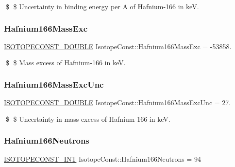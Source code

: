 \$ \$ Uncertainty in binding energy per A of Hafnium-\/166 in keV. \mbox{\label{group___isotope_const-_hafnium-_hf166_ga50a76d0c3fadf6638e1f6986a3275dd7}} 
\subsubsection{\texorpdfstring{Hafnium166\+Mass\+Exc}{Hafnium166MassExc}}
{\footnotesize\ttfamily \mbox{\hyperlink{group___isotope_const-_macros_ga8f45a7272ce02c0b4c65c44636ed719a}{I\+S\+O\+T\+O\+P\+E\+C\+O\+N\+S\+T\+\_\+\+D\+O\+U\+B\+LE}} Isotope\+Const\+::\+Hafnium166\+Mass\+Exc = -\/53858.}

\$ \$ Mass excess of Hafnium-\/166 in keV. \mbox{\label{group___isotope_const-_hafnium-_hf166_gae06bde1c7e7ce992949e9478ebd5bb50}} 
\subsubsection{\texorpdfstring{Hafnium166\+Mass\+Exc\+Unc}{Hafnium166MassExcUnc}}
{\footnotesize\ttfamily \mbox{\hyperlink{group___isotope_const-_macros_ga8f45a7272ce02c0b4c65c44636ed719a}{I\+S\+O\+T\+O\+P\+E\+C\+O\+N\+S\+T\+\_\+\+D\+O\+U\+B\+LE}} Isotope\+Const\+::\+Hafnium166\+Mass\+Exc\+Unc = 27.}

\$ \$ Uncertainty in mass excess of Hafnium-\/166 in keV. \mbox{\label{group___isotope_const-_hafnium-_hf166_gaee0794cc8d9635bbfa8adbf860c5d315}} 
\subsubsection{\texorpdfstring{Hafnium166\+Neutrons}{Hafnium166Neutrons}}
{\footnotesize\ttfamily \mbox{\hyperlink{group___isotope_const-_macros_ga5f18360b3e99483a35c32d789e62621c}{I\+S\+O\+T\+O\+P\+E\+C\+O\+N\+S\+T\+\_\+\+I\+NT}} Isotope\+Const\+::\+Hafnium166\+Neutrons = 94}

